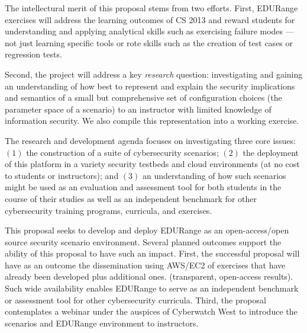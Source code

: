 \documentclass[11pt]{report}
\begin{document}
The intellectural merit of this proposal stems from two efforts.
First, EDURange exercises will address the learning outcomes of CS 2013
and reward students for understanding and
applying analytical skills such as exercising failure modes --- 
not just learning specific tools or rote skills
such as the creation of test cases or regression tests.  


Second, the project will address a key {\em research} question:
investigating and gaining an understanding of how best to represent and explain the
security implications and semantics of a small but comprehensive set of
configuration choices (the parameter space of a scenario) to an
instructor with limited knowledge of information security.  We also
compile this representation into a working exercise.

The research and development agenda focuses on investigating three
core issues: $(1)$ the construction of a suite of cybersecurity
scenarios; $(2)$ the deployment of this platform in a variety security
testbeds and cloud environments (at no cost to students or
instructors); and $(3)$ an understanding of how such scenarios might
be used as an evaluation and assessment tool for both students in the
course of their studies as well as an independent benchmark for other
cybersecurity training programs, curricula, and exercises.

This proposal seeks to develop and
deploy EDURange as an open-access/open source security scenario environment.
Several planned outcomes support the ability of this proposal to have
such an impact.  First, the successful proposal will have as an
outcome the dissemination using AWS/EC2 of exercises that have already been developed plus
additional ones.
(transparent, open-access results).    Such wide availability
enables EDURange to serve as an independent benchmark or assessment
tool for other cybersecurity curricula.  Third, the proposal
contemplates a webinar under the auspices of Cyberwatch West
to introduce the scenarios and EDURange environment to 
instructors. 
\end{document}
